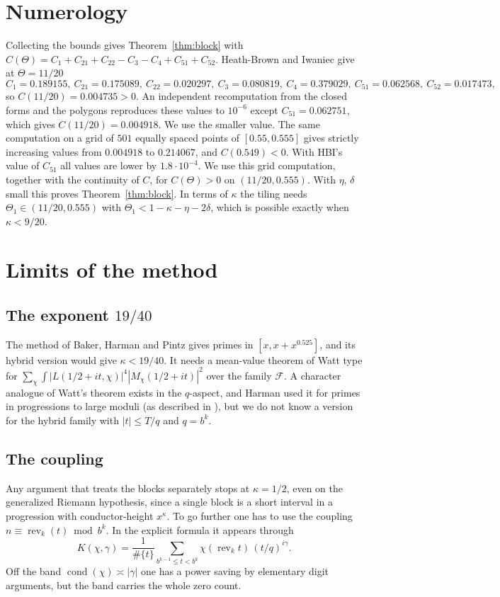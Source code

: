 \documentclass[11pt]{amsart}
\theoremstyle{definition}
\numberwithin{equation}{section}
\newcommand{\cF}{\mathcal{F}}
\newcommand{\rev}{\operatorname{rev}}
\newcommand{\cond}{\operatorname{cond}}
\begin{document}
\section{Numerology}\label{sec:num}

Collecting the bounds gives Theorem~\ref{thm:block} with $C(\Theta)=C_1+C_{21}+C_{22}-C_3-C_4+C_{51}+C_{52}$. Heath-Brown and Iwaniec \cite[p.~69]{HBI} give at $\Theta=11/20$
\[
C_1=0.189155,\ C_{21}=0.175089,\ C_{22}=0.020297,\ C_3=0.080819,\ C_4=0.379029,\ C_{51}=0.062568,\ C_{52}=0.017473,
\]
so $C(11/20)=0.004735>0$. An independent recomputation from the closed forms and the polygons reproduces these values to $10^{-6}$ except $C_{51}=0.062751$, which gives $C(11/20)=0.004918$. We use the smaller value. The same computation on a grid of $501$ equally spaced points of $[0.55,0.555]$ gives strictly increasing values from $0.004918$ to $0.214067$, and $C(0.549)<0$. With HBI's value of $C_{51}$ all values are lower by $1.8\cdot10^{-4}$. We use this grid computation, together with the continuity of $C$, for $C(\Theta)>0$ on $(11/20,0.555)$. With $\eta$, $\delta$ small this proves Theorem~\ref{thm:block}. In terms of $\kappa$ the tiling needs $\Theta_1\in(11/20,0.555)$ with $\Theta_1<1-\kappa-\eta-2\delta$, which is possible exactly when $\kappa<9/20$.

\section{Limits of the method}\label{sec:limits}

\subsection{The exponent $19/40$}
The method of Baker, Harman and Pintz gives primes in $[x,x+x^{0.525}]$, and its hybrid version would give $\kappa<19/40$. It needs a mean-value theorem of Watt type for $\sum_\chi\int|L(1/2+it,\chi)|^4|M_\chi(1/2+it)|^2$ over the family $\cF$. A character analogue of Watt's theorem exists in the $q$-aspect, and Harman used it for primes in progressions to large moduli (as described in \cite[\S2]{BP}), but we do not know a version for the hybrid family with $|t|\le T/q$ and $q=b^k$.

\subsection{The coupling}
Any argument that treats the blocks separately stops at $\kappa=1/2$, even on the generalized Riemann hypothesis, since a single block is a short interval in a progression with conductor-height $x^{\kappa}$. To go further one has to use the coupling $n\equiv\rev_k(t)\bmod b^k$. In the explicit formula it appears through
\[
K(\chi,\gamma)=\frac1{\#\{t\}}\sum_{b^{k-1}\le t<b^k}\chi(\rev_kt)\,(t/q)^{i\gamma}.
\]
Off the band $\cond(\chi)\asymp|\gamma|$ one has a power saving by elementary digit arguments, but the band carries the whole zero count.
\end{document}
